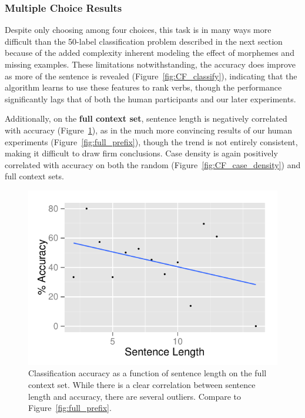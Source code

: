 \subsubsection{Multiple Choice Results}
Despite only choosing among four choices, this task is in many ways
more difficult than the 50-label classification problem described in
the next section because of the added complexity inherent modeling the
effect of morphemes and missing examples.  These limitations
notwithstanding, the accuracy does improve as more of the sentence is
revealed (Figure~\ref{fig:CF_classify}), indicating that the algorithm
learns to use these features to rank verbs, though the performance
significantly lags that of both the human participants and our later
experiments. 





Additionally, on the \textbf{full context set}, sentence length is
negatively correlated with accuracy
(Figure~\ref{fig:CF_classifier_length}), as in the much more
convincing results of our human experiments
(Figure~\ref{fig:full_prefix}), though the trend is not entirely
consistent, making it difficult to draw firm conclusions.  Case
density is again positively correlated with accuracy on both the
random (Figure~\ref{fig:CF_case_density}) and full context sets.
\begin{figure}[t!]
  \begin{center} \includegraphics[width=1.0\linewidth]{2016_conll_verbpred/figures/CF_len_run2} \caption{
      Classification accuracy as a function of sentence length on the
      full context set. While there is a clear correlation between
      sentence length and accuracy, there are several
      outliers. Compare to Figure~\ref{fig:full_prefix}.}
\label{fig:CF_classifier_length}
\end{center}
\end{figure}

